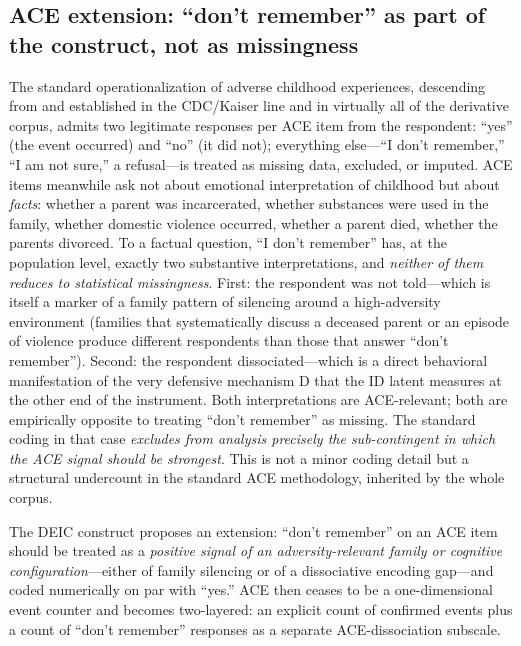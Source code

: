 \subsection{ACE extension: ``don't remember'' as part of the construct, not as missingness}
\label{subsec:ace_extension}

The standard operationalization of adverse childhood experiences, descending from \citet{felitti1998} and established in the CDC/Kaiser line and in virtually all of the derivative corpus, admits two legitimate responses per ACE item from the respondent: ``yes'' (the event occurred) and ``no'' (it did not); everything else---``I don't remember,'' ``I am not sure,'' a refusal---is treated as missing data, excluded, or imputed. ACE items meanwhile ask not about emotional interpretation of childhood but about \emph{facts}: whether a parent was incarcerated, whether substances were used in the family, whether domestic violence occurred, whether a parent died, whether the parents divorced. To a factual question, ``I don't remember'' has, at the population level, exactly two substantive interpretations, and \emph{neither of them reduces to statistical missingness}. First: the respondent was not told---which is itself a marker of a family pattern of silencing around a high-adversity environment (families that systematically discuss a deceased parent or an episode of violence produce different respondents than those that answer ``don't remember''). Second: the respondent dissociated---which is a direct behavioral manifestation of the very defensive mechanism D that the ID latent measures at the other end of the instrument. Both interpretations are ACE-relevant; both are empirically opposite to treating ``don't remember'' as missing. The standard coding in that case \emph{excludes from analysis precisely the sub-contingent in which the ACE signal should be strongest}. This is not a minor coding detail but a structural undercount in the standard ACE methodology, inherited by the whole corpus.

The DEIC construct proposes an extension: ``don't remember'' on an ACE item should be treated as a \emph{positive signal of an adversity-relevant family or cognitive configuration}---either of family silencing or of a dissociative encoding gap---and coded numerically on par with ``yes.'' ACE then ceases to be a one-dimensional event counter and becomes two-layered: an explicit count of confirmed events plus a count of ``don't remember'' responses as a separate ACE-dissociation subscale.


